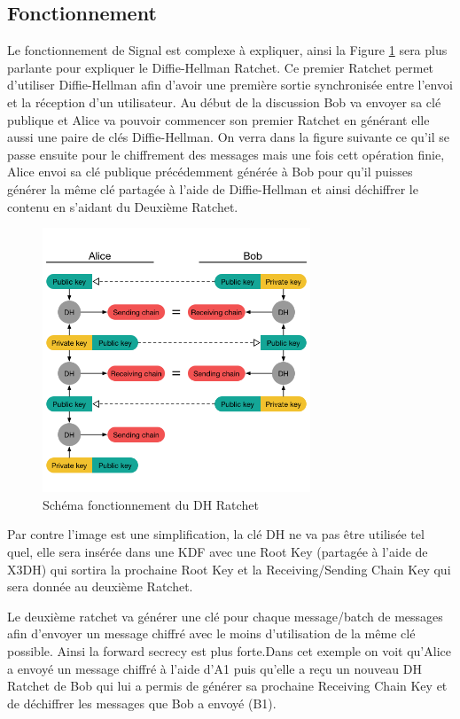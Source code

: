 \subsection{Fonctionnement}
Le fonctionnement de Signal est complexe à expliquer, ainsi la Figure \ref{fig:signal} sera plus parlante pour expliquer le Diffie-Hellman Ratchet. Ce premier Ratchet permet d'utiliser Diffie-Hellman afin d'avoir une première sortie synchronisée entre l'envoi et la réception d'un utilisateur. Au début de la discussion Bob va envoyer sa clé publique et Alice va pouvoir commencer son premier Ratchet en générant elle aussi une paire de clés Diffie-Hellman. On verra dans la figure suivante ce qu'il se passe ensuite pour le chiffrement des messages mais une fois cett opération finie, Alice envoi sa clé publique précédemment générée à Bob pour qu'il puisses générer la même clé partagée à l'aide de Diffie-Hellman et ainsi déchiffrer le contenu en s'aidant du Deuxième Ratchet.

\begin{figure}[h!]
	\centering
	\includegraphics[width=8cm]{images/signalFonctionnement.png}
	\caption{Schéma fonctionnement du DH Ratchet~\cite{doubleratchet}}
	\label{fig:signal}
\end{figure}

Par contre l'image est une simplification, la clé DH ne va pas être utilisée tel quel, elle sera insérée dans une KDF avec une Root Key (partagée à l'aide de X3DH) qui sortira la prochaine Root Key et la Receiving/Sending Chain Key qui sera donnée au deuxième Ratchet.

Le deuxième ratchet va générer une clé pour chaque message/batch de messages afin d'envoyer un message chiffré avec le moins d'utilisation de la même clé possible. Ainsi la forward secrecy est plus forte.Dans cet exemple on voit qu'Alice a envoyé un message chiffré à l'aide d'A1 puis qu'elle a reçu un nouveau DH Ratchet de Bob qui lui a permis de générer sa prochaine Receiving Chain Key et de déchiffrer les messages que Bob a envoyé (B1).

